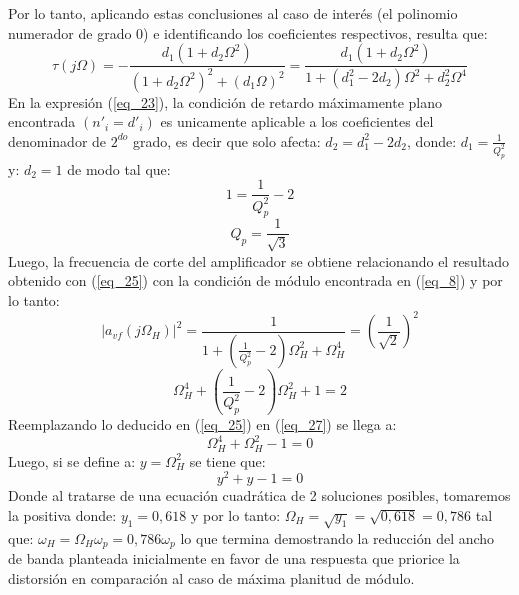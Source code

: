 \documentclass[12pt,a4paper]{article}
\begin{document}
\begin{itemize}
    Por lo tanto, aplicando estas conclusiones al caso de interés (el polinomio numerador de grado 0) e identificando los coeficientes respectivos, resulta que:
    \begin{equation}
        \label{eq_23}
        \tau(j\Omega) = - \frac{d_1(1 + d_2\Omega^2)}{(1 + d_2\Omega^2)^2 + (d_1\Omega)^2} = \frac{d_1(1 + d_2\Omega^2)}{1 + (d_1^2 - 2d_2)\Omega^2 + d_2^2\Omega^4}
    \end{equation}
    En la expresión (\ref{eq_23}), la condición de retardo máximamente plano encontrada $(n'_i=d'_i)$ es unicamente aplicable a los coeficientes del denominador de $2^{do}$ grado, es decir que solo afecta: $d_2 = d_1^2 - 2d_2$, donde: $d_1 = \frac{1}{Q_p^2}$ y: $d_2 = 1$ de modo tal que:
    \begin{equation}
        \label{eq_24}
        1 = \frac{1}{Q_p^2}-2
    \end{equation}
    \begin{equation}
        \label{eq_25}
        Q_p = \frac{1}{\sqrt{3}}
    \end{equation}
    Luego, la frecuencia de corte del amplificador se obtiene relacionando el resultado obtenido con (\ref{eq_25}) con la condición de módulo encontrada en (\ref{eq_8}) y por lo tanto:
    \begin{equation}
        \label{eq_26}
        |a_{vf}(j\Omega_H)|^2 = \frac{1}{1 + \left(\frac{1}{Q_p^2} - 2\right)\Omega_H^2 + \Omega_H^4} = \left(\frac{1}{\sqrt{2}}\right)^2
    \end{equation}
    \begin{equation}
        \label{eq_27}
        \Omega_H^4 + \left(\frac{1}{Q_p^2} - 2\right)\Omega_H^2 +  1 = 2
    \end{equation}
    Reemplazando lo deducido en (\ref{eq_25}) en (\ref{eq_27}) se llega a:
    \begin{equation}
        \label{eq_28}
        \Omega_H^4 + \Omega_H^2 -1 = 0
    \end{equation}
    Luego, si se define a: $y=\Omega_H^2$ se tiene que:
    \begin{equation}
        \label{eq_29}
        y^2 + y - 1 = 0
    \end{equation}
    Donde al tratarse de una ecuación cuadrática de 2 soluciones posibles, tomaremos la positiva donde: $y_1=0,618$ y por lo tanto: $\Omega_H = \sqrt{y_1} = \sqrt{0,618} = 0,786$ tal que: $\omega_H = \Omega_H \omega_p = 0,786 \omega_p$ lo que termina demostrando la reducción del ancho de banda planteada inicialmente en favor de una respuesta que priorice la distorsión en comparación al caso de máxima planitud de módulo.

\end{itemize}
\end{document}
